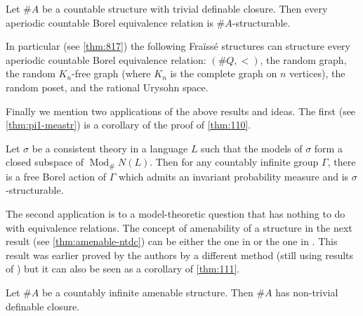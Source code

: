 \documentclass[11pt]{article}
\DeclareMathOperator\Mod{Mod}
\begin{document}
\begin{theorem}[Marks]\label{thm:111}
Let $\#A$ be a countable structure with trivial definable closure.  Then every aperiodic countable Borel equivalence relation is $\#A$-structurable.
\end{theorem}

In particular (see \cref{thm:817}) the following Fraïssé structures can structure every aperiodic countable Borel equivalence relation: $(\#Q, <)$, the random graph, the random $K_n$-free graph (where $K_n$ is the complete graph on $n$ vertices), the random poset, and the rational Urysohn space.

Finally we mention two applications of the above results and ideas.  The first (see \cref{thm:pi1-meastr}) is a corollary of the proof of \cref{thm:110}.

\begin{theorem}
Let $\sigma$ be a consistent theory in a language $L$ such that the models of $\sigma$ form a closed subspace of $\Mod_\#N(L)$.  Then for any countably infinite group $\Gamma$, there is a free Borel action of $\Gamma$ which admits an invariant probability measure and is $\sigma$-structurable.
\end{theorem}

The second application is to a model-theoretic question that has nothing to do with equivalence relations. The concept of amenability of a structure in the next result (see \cref{thm:amenable-ntdc}) can be either the one in \cite[2.16(iii)]{JKL} or the one in \cite[3.4]{Kamt}.  This result was earlier proved by the authors by a different method (still using results of \cite{AFP}) but it can also be seen as a corollary of \cref{thm:111}.

\begin{theorem}
Let $\#A$ be a countably infinite amenable structure.  Then $\#A$ has non-trivial definable closure.
\end{theorem}
\end{document}
